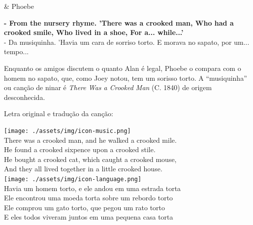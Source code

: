 \begin{tcolorbox}[enhanced,center upper,
    drop fuzzy shadow southeast, boxrule=0.3pt,
    lower separated=false,
    colframe=black!30!dialogoBorder,colback=white]
\begin{minipage}[c]{0.16\linewidth}
   & \centering \scriptsize{Phoebe}
\end{minipage}
\hfill
\begin{minipage}[c]{0.8\linewidth}
  \textbf{- From the nursery rhyme. 'There was a crooked man, Who had a crooked smile, Who lived in a shoe, For a... while...'}\\
  - Da musiquinha. 'Havia um cara de sorriso torto. E morava no sapato, por um... tempo...
\end{minipage}
\end{tcolorbox}

Enquanto os amigos discutem o quanto Alan é legal, Phoebe o compara com
o homem no sapato, que, como Joey notou, tem um sorisso torto. A
``musiquinha'' ou canção de ninar é \emph{There Was a Crooked Man} (C.
1840) de origem desconhecida.

Letra original e tradução da canção:

\bigskip
\begin{tcolorbox}[enhanced,
    drop fuzzy shadow southeast, boxrule=0.3pt,
    lower separated=false, sidebyside, sidebyside align=top,
    halign=flush right, halign lower=left,
    colframe=black!30!dialogoBorder,colback=musicaBg]
\texttt{[image: ./assets/img/icon-music.png]}\\
There was a crooked man, and he walked a crooked mile.\\He found a crooked sixpence upon a crooked stile.\\He bought a crooked cat, which caught a crooked mouse,\\And they all lived together in a little crooked house.\\
\tcblower
\texttt{[image: ./assets/img/icon-language.png]}\\
Havia um homem torto, e ele andou em uma estrada torta\\Ele encontrou uma moeda torta sobre um rebordo torto\\Ele comprou um gato torto, que pegou um rato torto\\E eles todos viveram juntos em uma pequena casa torta\\
\end{tcolorbox}

